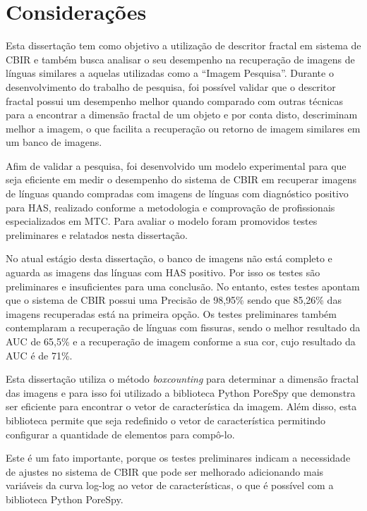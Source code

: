 \chapter{Considerações}
\label{chap:conclusao}

Esta dissertação tem como objetivo a utilização de descritor fractal em sistema de CBIR e também busca analisar o seu desempenho na recuperação de imagens de línguas similares a aquelas utilizadas como a “Imagem Pesquisa”. Durante o desenvolvimento do trabalho de pesquisa, foi possível validar que o descritor fractal possui um desempenho melhor quando comparado com outras técnicas para a encontrar a dimensão fractal de um objeto  e por conta disto, descriminam melhor a imagem, o que facilita a recuperação ou retorno de imagem similares em um banco de imagens.

Afim de validar a pesquisa, foi desenvolvido um modelo experimental para que seja eficiente em medir o desempenho do sistema de CBIR em recuperar imagens de línguas quando compradas com imagens de línguas com diagnóstico positivo para HAS, realizado conforme a metodologia e comprovação de profissionais especializados em MTC. Para avaliar o modelo foram promovidos testes preliminares e relatados nesta dissertação.

No atual estágio desta dissertação, o banco de imagens não está completo e aguarda as imagens das línguas com HAS positivo. Por isso os testes são preliminares e insuficientes para uma conclusão. No entanto, estes testes apontam que o sistema de CBIR possui uma Precisão de 98,95\% sendo que 85,26\% das imagens recuperadas está na primeira opção. Os testes preliminares também contemplaram a recuperação de línguas com fissuras, sendo o melhor resultado da AUC de 65,5\% e a recuperação de imagem conforme a sua cor, cujo resultado da AUC é de 71\%.

Esta dissertação utiliza o método \textit{boxcounting} para determinar a dimensão fractal das imagens e para isso foi utilizado a biblioteca Python PoreSpy que demonstra ser eficiente para encontrar o vetor de característica da imagem. Além disso, esta biblioteca permite que seja redefinido o vetor de característica permitindo configurar a quantidade de elementos para compô-lo. 

Este é um fato importante, porque os testes preliminares indicam a necessidade de ajustes no sistema de CBIR que pode ser melhorado adicionando mais variáveis da curva log-log ao vetor de características, o que é possível com a biblioteca Python PoreSpy.

